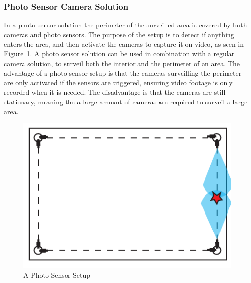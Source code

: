 \subsubsection{Photo Sensor Camera Solution}
In a photo sensor solution the perimeter of the surveilled area is covered by both cameras and photo sensors.
The purpose of the setup is to detect if anything enters the area, and then activate the cameras to capture it on video, as seen in Figure~\ref{fig:photo_sensor}.
A photo sensor solution can be used in combination with a regular camera solution, to surveil both the interior and the perimeter of an area.
The advantage of a photo sensor setup is that the cameras surveilling the perimeter are only activated if the sensors are triggered, ensuring video footage is only recorded when it is needed.
The disadvantage is that the cameras are still stationary, meaning the a large amount of cameras are required to surveil a large area.
\begin{figure}[htb]
    \centering
    \includegraphics[width=\textwidth]{gfx/light_sensor.pdf}
    \caption{A Photo Sensor Setup}
    \label{fig:photo_sensor}
\end{figure}


